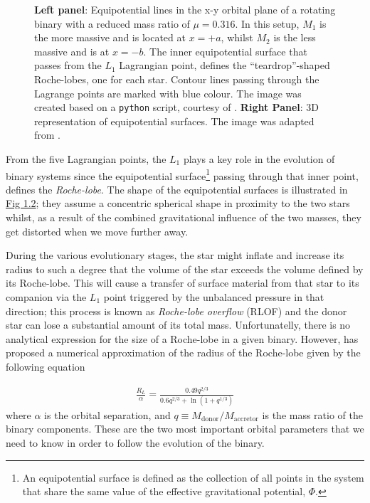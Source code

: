 \documentclass[../../main/thesis_msc.tex]{subfiles}
\begin{document}
\begin{figure}[h]
\begin{subfigure}[h]{0.535\textwidth}
   					 \end{subfigure}
   					 \caption{\textbf{Left panel}: Equipotential lines in the x-y orbital plane of a rotating binary with a reduced mass ratio of $\mu = 0.316$. In this setup, $M_1$ is the more massive and is located at $x = +a$, whilst $M_2$ is the less massive and is at $x = -b$. The inner equipotential surface that passes from the $L_1$ Lagrangian point, defines the ``teardrop''-shaped Roche-lobes, one for each star. Contour lines passing through the Lagrange points are marked with blue colour. The image was created based on a \texttt{python} script, courtesy of \cite{Zingale}. \textbf{Right Panel}: 3D representation of equipotential surfaces. The image was adapted from \cite{Sluijs}.}
   					 \label{fig:eq_sur}
				\end{figure}
				
				From the five Lagrangian points, the $L_1$ plays a key role in the evolution of binary systems since the equipotential surface\footnote{An equipotential surface is defined as the collection of all points in the system that share the same value of the effective gravitational potential, $\Phi$.} passing through that inner point, defines the \emph{Roche-lobe}. The shape of the equipotential surfaces is illustrated in \hyperref[fig:eq_sur]{Fig 1.2}; they assume a concentric spherical shape in proximity to the two stars whilst, as a result of the combined gravitational influence of the two masses, they get distorted when we move further away.
				
				During the various evolutionary stages, the star might inflate and increase its radius to such a degree that the volume of the star exceeds the volume defined by its Roche-lobe. This will cause a transfer of surface material from that star to its companion via the $L_1$ point triggered by the unbalanced pressure in that direction; this process is known as \emph{Roche-lobe overflow} (RLOF) and the donor star can lose a substantial amount of its total mass. Unfortunatelly, there is no analytical expression for the size of a Roche-lobe in a given binary. However, \cite{Eggleton1983} has proposed a numerical approximation of the radius of the Roche-lobe given by the following equation
				
				\begin{eqnarray}
					\label{eq:rl_radius}
					\frac{R_L}{\alpha} = \frac{0.49 q^{2/3}}{0.6 q^{2/3} + \ln(1 + q^{1/3})}
				\end{eqnarray}				 
				where $\alpha$ is the orbital separation, and $q \equiv M_{\text{donor}} / M_{\text{accretor}}$ is the mass ratio of the binary components. These are the two most important orbital parameters that we need to know in order to follow the evolution of the binary.
				
\end{document}
